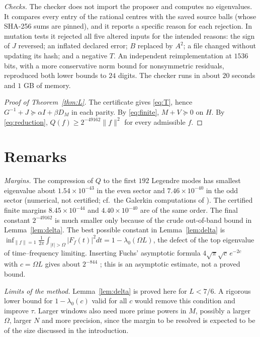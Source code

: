 \documentclass[11pt]{amsart}
\theoremstyle{remark}
\numberwithin{equation}{section}
\begin{document}
\emph{Checks.} The checker does not import the proposer and computes no eigenvalues. It compares every entry of the rational centres with the saved source balls (whose SHA-256 sums are pinned), and it reports a specific reason for each rejection. In mutation tests it rejected all five altered inputs for the intended reasons: the sign of $J$ reversed; an inflated declared error; $B$ replaced by $A^2$; a file changed without updating its hash; and a negative $T$. An independent reimplementation at $1536$ bits, with a more conservative norm bound for nonsymmetric residuals, reproduced both lower bounds to $24$ digits. The checker runs in about $20$ seconds and $1$ GB of memory.

\begin{proof}[Proof of Theorem~\ref{thm:L}]
The certificate gives \eqref{eq:T}, hence $G^{-1}+J\succeq\alpha I+\beta D_M$ in each parity. By \eqref{eq:finite}, $M+V\succeq0$ on $H$. By \eqref{eq:reduction}, $Q(f)\ge2^{-49162}\|f\|^2$ for every admissible $f$.
\end{proof}

\section{Remarks}

\emph{Margins.} The compression of $Q$ to the first $192$ Legendre modes has smallest eigenvalue about $1.54\times10^{-43}$ in the even sector and $7.46\times10^{-40}$ in the odd sector (numerical, not certified; cf.\ the Galerkin computations of \cite{MoriWeilV}). The certified finite margins $8.45\times10^{-44}$ and $4.40\times10^{-40}$ are of the same order. The final constant $2^{-49162}$ is much smaller only because of the crude out-of-band bound in Lemma~\ref{lem:delta}. The best possible constant in Lemma~\ref{lem:delta} is $\inf_{\|f\|=1}\frac1{2\pi}\int_{|t|>\Omega}|F_f(t)|^2dt=1-\lambda_0(\Omega L)$, the defect of the top eigenvalue of time--frequency limiting. Inserting Fuchs' asymptotic formula $4\sqrt\pi\sqrt c\,e^{-2c}$ with $c=\Omega L$ gives about $2^{-844}$ \cite{Fuchs64,MoriPSWF}; this is an asymptotic estimate, not a proved bound.

\emph{Limits of the method.} Lemma~\ref{lem:delta} is proved here for $L<7/6$. A rigorous lower bound for $1-\lambda_0(c)$ valid for all $c$ would remove this condition and improve $\tau$. Larger windows also need more prime powers in $M$, possibly a larger $\Omega$, larger $N$ and more precision, since the margin to be resolved is expected to be of the size discussed in the introduction.
\end{document}
